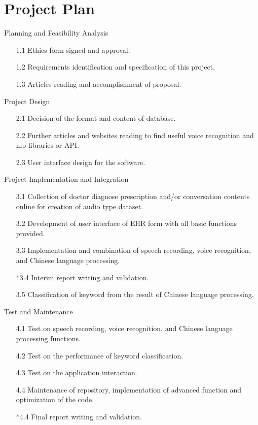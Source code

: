 \documentclass[12pt, a4paper, twoside]{extarticle}
\begin{document}
\section{Project Plan}
\begin{exmp}
\normalfont
Planning and Feasibility Analysis
    \begin{enumerate}
        \item[1.1] Ethics form signed and approval.
        \item[1.2] Requirements identification and specification of this project.
        \item[1.3] Articles reading and accomplishment of proposal.
    \end{enumerate}
\end{exmp}
\begin{exmp}
\normalfont
Project Design
    \begin{enumerate}
        \item[2.1] Decision of the format and content of database.
        \item[2.2] Further articles and websites reading to find useful voice recognition and nlp libraries or API.
        \item[2.3] User interface design for the software.
    \end{enumerate}
\end{exmp}
\begin{exmp}
\normalfont
Project Implementation and Integration
    \begin{enumerate}
        \item[3.1] Collection of doctor diagnose prescription and/or conversation contents online for creation of audio type dataset.
        \item[3.2] Development of user interface of EHR form with all basic functions provided.
        \item[3.3] Implementation and combination of speech recording, voice recognition, and Chinese language processing.
        \item[*3.4] Interim report writing and validation.
        \item[3.5]Classification of keyword from the result of Chinese language processing.
    \end{enumerate}
\end{exmp}
\begin{exmp}
\normalfont
Test and Maintenance
    \begin{enumerate}
        \item[4.1] Test on speech recording, voice recognition, and Chinese language processing functions.
        \item[4.2] Test on the performance of keyword classification.
        \item[4.3] Test on the application interaction.
        \item[4.4] Maintenance of repository, implementation of advanced function and optimization of the code.
        \item[*4.4] Final report writing and validation.
    \end{enumerate}
\end{exmp}
\end{document}
